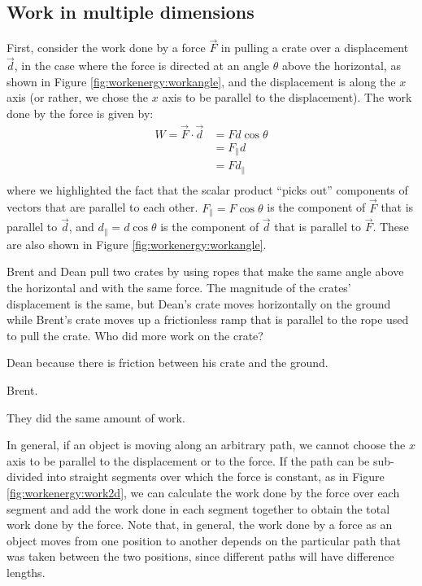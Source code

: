 \subsection{Work in multiple dimensions}
First, consider the work done by a force $\vec F$ in pulling a crate over a displacement $\vec d$, in the case where the force is directed at an angle $\theta$ above the horizontal, as shown in Figure \ref{fig:workenergy:workangle}, and the displacement is along the $x$ axis (or rather, we chose the $x$ axis to be parallel to the displacement).
The work done by the force is given by:
\begin{align*}
W = \vec F \cdot \vec d &= Fd\cos\theta\\
&= F_{\parallel}d\\
&= Fd_{\parallel}\\
\end{align*}
where we highlighted the fact that the scalar product ``picks out'' components of vectors that are parallel to each other. $F_{\parallel} = F\cos\theta$ is the component of $\vec F$ that is parallel to $\vec d$, and $d_{\parallel}=d\cos\theta$ is the component of $\vec d$ that is parallel to $\vec F$. These are also shown in Figure \ref{fig:workenergy:workangle}.

\begin{checkpoint}
\begin{MCquestion}{
Brent and Dean pull two crates by using ropes that make the same angle above the horizontal and with the same force. The magnitude of the crates' displacement is the same, but Dean's crate moves horizontally on the ground while Brent's crate moves up a frictionless ramp that is parallel to the rope used to pull the crate. Who did more work on the crate?}
\item Dean because there is friction between his crate and the ground.
\item Brent. \correct
\item They did the same amount of work.
\end{MCquestion}
\end{checkpoint}

In general, if an object is moving along an arbitrary path, we cannot choose the $x$ axis to be parallel to the displacement or to the force. If the path can be sub-divided into straight segments over which the force is constant, as in Figure \ref{fig:workenergy:work2d}, we can calculate the work done by the force over each segment and add the work done in each segment together to obtain the total work done by the force. Note that, in general, the work done by a force as an object moves from one position to another depends on the particular path that was taken between the two positions, since different paths will have difference lengths.

